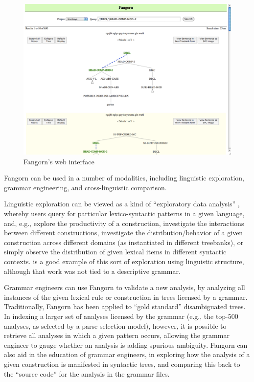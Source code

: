 \documentclass[12pt]{article}
\begin{document}
\begin{figure}[t]
\centering
\includegraphics[width=6in]{searchinterface}
\caption{Fangorn's web interface}
\label{fig:ts_web}
\end{figure}

Fangorn can be used in a number of modalities, including
linguistic exploration, grammar engineering, and cross-linguistic
comparison.

Linguistic exploration can be viewed as a kind of ``exploratory data
analysis'' \cite{Tukey77}, whereby users query for particular
lexico-syntactic patterns in a given language, and, e.g., explore
the productivity of a construction, investigate the interactions between
different constructions, investigate the distribution/behavior of a
given construction across different domains (as instantiated in
different treebanks), or simply observe the distribution of given
lexical items in different syntactic contexts.  is a good example of this sort of exploration using linguistic structure, although that work was not tied to a descriptive grammar.

Grammar engineers can use Fangorn to validate a new analysis, by
analyzing all instances of the given lexical rule or construction in
trees licensed by a grammar. Traditionally, Fangorn has been
applied to ``gold standard'' disambiguated trees. In indexing a larger
set of analyses licensed by the grammar (e.g., the top-500 analyses, as
selected by a parse selection model), however, it is possible to
retrieve all analyses in which a given pattern occurs, allowing the
grammar engineer to gauge whether an analysis is
adding spurious ambiguity. Fangorn can also aid in the education of grammar
engineers, in exploring how the analysis of a given construction is
manifested in syntactic trees, and comparing this back to the ``source
code'' for the analysis in the grammar files.
\end{document}

